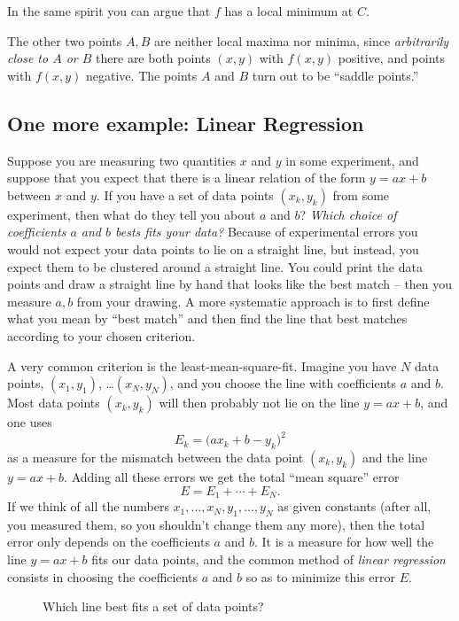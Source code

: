 In the same spirit you can argue that $f$ has a local minimum at $C$.

The other two points $A,B$ are neither local maxima nor minima, since
\textit{arbitrarily close to $A$ or $B$} there are both points $(x,y)$ with
$f(x,y)$ positive, and points with $f(x,y)$ negative.  The points $A$ and
$B$ turn out to be ``saddle points.''

\subsection{One more example: Linear Regression}  %

\label{sec:linear-regression} 

Suppose you are measuring two quantities $x$ and $y$ in some experiment,
and suppose that you expect that there is a linear relation of the form
$y=ax+b$ between $x$ and $y$.  If you have a set of data points $(x_k,
y_k)$ from some experiment, then what do they tell you about $a$ and $b$?
\emph{Which choice of coefficients $a$ and $b$ bests fits your data? }
Because of experimental errors you would not expect your data points to lie
on a straight line, but instead, you expect them to be clustered around a
straight line.  You could print the data points and draw a straight line by
hand that looks like the best match -- then you measure $a,b$ from your
drawing.  A more systematic approach is to first define what you mean by
``best match'' and then find the line that best matches according to your
chosen criterion.

A very common criterion is the least-mean-square-fit.  Imagine you have $N$
data points, $(x_1,y_1)$, \ldots $(x_N, y_N)$, and you choose the line with
coefficients $a$ and $b$.  Most data points $(x_k, y_k)$ will then probably
not lie on the line $y=ax+b$, and one uses
\[
E_k = \bigl(ax_k+b-y_k\bigr)^2
\]
as a measure for the mismatch between the data point $(x_k, y_k)$ and the
line $y=ax+b$.  Adding all these errors we get the total ``mean square''
error
\[
E= E_1 + \cdots + E_N.
\]
If we think of all the numbers $x_1, \ldots, x_N, y_1, \ldots, y_N$ as
given constants (after all, you measured them, so you shouldn't change them
any more), then the total error only depends on the coefficients $a$ and
$b$.  It is a measure for how well the line $y=ax+b$ fits our data points,
and the common method of \emph{linear regression} consists in choosing the
coefficients $a$ and $b$ so as to minimize this error $E$.

\begin{figure}[htb]
  \centering
  
  \caption{Which line best fits a set of data points?}
\label{fig:linear-regression} 
\end{figure}

